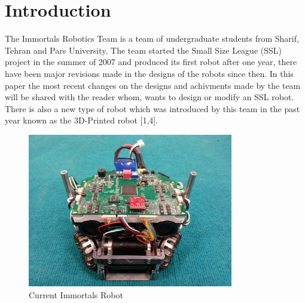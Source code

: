 \documentclass[runningheads,a4paper]{llncs}
\begin{document}
\section{Introduction}
The Immortals Robotics Team is a team of undergraduate students from Sharif, Tehran and Pars University. The team started the Small Size League (SSL) project in the summer of 2007 and produced its first robot after one year, there have been major revisions made in the designs of the robots since then. In this paper the most recent changes on the designs and achivments made by the team will be shared with the reader whom, wants to design or modify an SSL robot. There is also a new type of robot which was introduced by this team in the past year known as the 3D-Printed robot [1,4].%
\begin{figure}
	\centering
	\includegraphics[width=0.8\textwidth]{images/CURRENT.jpg}
	\caption{Current Immortals Robot}
	\label{fig:CURRENT_ROBOT}
\end{figure}
\end{document}
